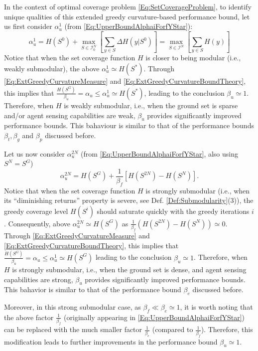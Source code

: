 \documentclass[letterpaper, 10 pt, conference]{ieeeconf}
\begin{document}
In the context of optimal coverage problem \eqref{Eq:SetCoverageProblem}, to identify unique qualities of this extended greedy curvature-based performance bound, let us first consider $\alpha_u^1$ (from \eqref{Eq:UpperBoundAlphaiForfYStar}):
\begin{equation*}
\alpha_u^1 = 
H(S^{0}) + \underset{S\in\mathcal{I}^N_{0}}{\max} \left[ \sum_{y\in S} \Delta H(y \vert S^{0})\right] = 
\underset{S\in\mathcal{I}^N}{\max} \left[ \sum_{y\in S} H(y)\right]     
\end{equation*}
Notice that when the set coverage function $H$ is closer to being modular (i.e., weakly submodular), the above $\alpha_u^1 \simeq H(S^*)$. Through \eqref{Eq:ExtGreedyCurvatureMeasure} and \eqref{Eq:ExtGreedyCurvatureBoundTheory}, this implies that $\frac{H(S^G)}{\beta_u} = \alpha_u  \leq \alpha_u^1 \simeq H(S^*)$, leading to the conclusion $\beta_u \simeq 1$. Therefore, when $H$ is weakly submodular, i.e., when the ground set is sparse and/or agent sensing capabilities are weak, $\beta_u$ provides significantly improved performance bounds. This bahaviour is similar to that of the performance bounds $\beta_t,\beta_g$ and $\beta_p$ discussed before.

Let us now consider $\alpha_u^{2N}$ (from \eqref{Eq:UpperBoundAlphaiForfYStar}, also using $S^N=S^G$)
\begin{equation}
\alpha_u^{2N} = H(S^G) + \frac{1}{\beta_f}\left[H(S^{2N})-H(S^{N})\right].
\end{equation}
Notice that when the set coverage function $H$ is strongly submodular (i.e., when its ``diminishing returns'' property is severe, see Def. \ref{Def:Submodularity}(3)), the greedy coverage level $H(S^i)$ should saturate quickly with the greedy iterations $i$. Consequently, above $\alpha_u^{2N}\simeq H(S^G)$ as $\frac{1}{\beta_f}(H(S^{2N})-H(S^{N}))\simeq 0$. Through \eqref{Eq:ExtGreedyCurvatureMeasure} and \eqref{Eq:ExtGreedyCurvatureBoundTheory}, this implies that $\frac{H(S^G)}{\beta_u} = \alpha_u  \leq \alpha_u^1 \simeq H(S^G)$ leading to the conclusion $\beta_u \simeq 1$. Therefore, when $H$ is strongly submodular, i.e., when the ground set is dense, and agent sensing capabilities are strong, $\beta_u$ provides significantly improved performance bounds. This bahavior is similar to that of the performance bound $\beta_e$ discussed before. 


Moreover, in this strong submodular case, as $\beta_f \ll \beta_e \simeq 1$, it is worth noting that the above factor $\frac{1}{\beta_f}$ (originally appearing in \eqref{Eq:UpperBoundAlphaiForfYStar}) can be replaced with the much smaller factor $\frac{1}{\beta_e}$ (compared to $\frac{1}{\beta_f}$). Therefore, this modification leads to further improvements in the performance bound $\beta_u \simeq 1$. 
\end{document}
